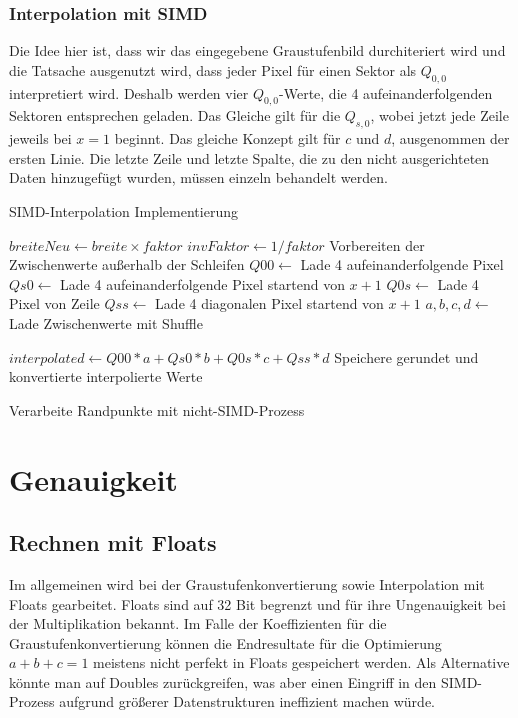 \documentclass[course=erap]{aspdoc}
\begin{document}
\subsubsection{Interpolation mit SIMD}
Die Idee hier ist, dass wir das eingegebene Graustufenbild durchiteriert wird und die Tatsache ausgenutzt wird, dass jeder Pixel für einen Sektor als $Q_{0,0}$ interpretiert wird. Deshalb werden vier $Q_{0,0}$-Werte, die 4 aufeinanderfolgenden Sektoren entsprechen geladen. Das Gleiche gilt für die $Q_{s,0}$, wobei jetzt jede Zeile jeweils bei $x=1$ beginnt. Das gleiche Konzept gilt für $c$ und $d$, ausgenommen der ersten Linie. Die letzte Zeile und letzte Spalte, die zu den nicht ausgerichteten Daten hinzugefügt wurden, müssen einzeln behandelt werden.
\begin{algorithm}
\caption{SIMD-Interpolation Implementierung}\label{alg:simd_interpolation}
\begin{algorithmic}[1]
\State $breiteNeu \gets breite \times faktor$
\State $invFaktor \gets 1 / faktor$
\State Vorbereiten der Zwischenwerte außerhalb der Schleifen
        \State $Q00 \gets$ Lade 4 aufeinanderfolgende Pixel
        \State $Qs0 \gets$ Lade 4 aufeinanderfolgende Pixel startend von $x + 1$ 
        \State $Q0s \gets$ Lade 4 Pixel von  Zeile
        \State $Qss \gets$ Lade 4 diagonalen Pixel startend von $x + 1$ 
                \State $a, b, c, d \gets$ Lade Zwischenwerte mit Shuffle
                
                \State $interpolated \gets Q00*a + Qs0*b + Q0s*c + Qss*d$                 
                \State Speichere gerundet und konvertierte interpolierte Werte
            \EndFor
        \EndFor
    \EndFor
    
\EndFor
\State Verarbeite Randpunkte mit nicht-SIMD-Prozess
\end{algorithmic}
\end{algorithm}

\section{Genauigkeit}
\subsection{Rechnen mit Floats}
Im allgemeinen wird bei der Graustufenkonvertierung sowie Interpolation mit Floats gearbeitet. Floats sind auf 32 Bit begrenzt und für ihre Ungenauigkeit bei der Multiplikation bekannt. Im Falle der Koeffizienten für die Graustufenkonvertierung können die Endresultate für die Optimierung $a + b + c = 1$ meistens nicht perfekt in Floats gespeichert werden. Als Alternative könnte man auf Doubles zurückgreifen, was aber einen Eingriff in den SIMD-Prozess aufgrund größerer Datenstrukturen ineffizient machen würde.
\end{document}

